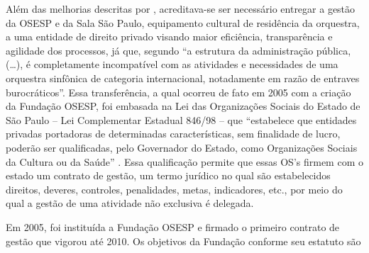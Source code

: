 \documentclass[a4paper, 12pt, openright, oneside, german, french, english, brazil]{abntex2}
\begin{document}
	Além das melhorias descritas por , acreditava-se ser necessário entregar a gestão da OSESP e da Sala São Paulo, equipamento cultural de residência da orquestra, a uma entidade de direito privado visando maior eficiência, transparência e agilidade dos processos, já que, segundo  ``a estrutura da administração pública, (\ldots), é completamente incompatível com as atividades e necessidades de uma orquestra sinfônica de categoria internacional, notadamente em razão de entraves burocráticos''. Essa transferência, a qual ocorreu de fato em 2005 com a criação da Fundação OSESP, foi embasada na Lei das Organizações Sociais do Estado de São Paulo -- Lei Complementar Estadual 846/98 -- que ``estabelece que entidades privadas portadoras de determinadas características, sem finalidade de lucro, poderão ser qualificadas, pelo Governador do Estado, como Organizações Sociais da Cultura ou da Saúde'' \cite[p. 6]{arruda2010parcerias}. Essa qualificação permite que essas OS's firmem com o estado um contrato de gestão, um termo jurídico no qual são estabelecidos direitos, deveres, controles, penalidades, metas, indicadores, etc., por meio do qual a gestão de uma atividade não exclusiva é delegada. 
	
	Em 2005, foi instituída a Fundação OSESP e firmado o primeiro contrato de gestão que vigorou até 2010.
	Os objetivos da Fundação conforme seu estatuto são
	
\end{document}
